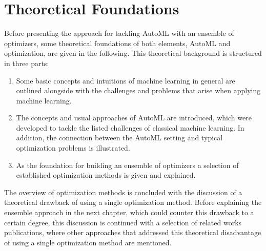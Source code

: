 %
\chapter{Theoretical Foundations}
\label{sec:theory}
Before presenting the approach for tackling AutoML with an ensemble of optimizers, some theoretical foundations of both elements, AutoML and optimization, are given in the following.
This theoretical background is structured in three parts:
\begin{enumerate}
    \item Some basic concepts and intuitions of machine learning in general are outlined alongside with the challenges and problems that arise when applying machine learning.
    \item The concepts and usual approaches of AutoML are introduced, which were developed to tackle the listed challenges of classical machine learning. In addition, the connection between the AutoML setting and typical optimization problems is illustrated.
    \item As the foundation for building an ensemble of optimizers a selection of established optimization methods is given and explained.
\end{enumerate}
The overview of optimization methods is concluded with the discussion of a theoretical drawback of using a single optimization method.
Before explaining the ensemble approach in the next chapter, which could counter this drawback to a certain degree, this discussion is continued with a selection of related works publications, where other approaches that addressed this theoretical disadvantage of using a single optimization method are mentioned. 

